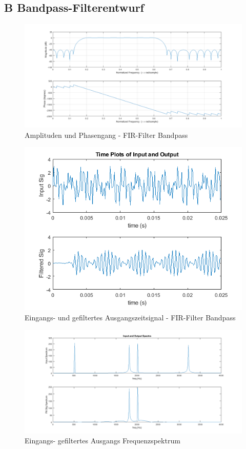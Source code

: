 \newpage
\subsection{B Bandpass-Filterentwurf}






\begin{figure}[h]
\centering
\includegraphics[width=0.7\linewidth]{./Bilder/Attachment_B_fir_3_Amplitudengang}
\caption{Amplituden und Phasengang - FIR-Filter Bandpass}
\label{fig:Attachment_B_fir_3_Amplitudengang}
\end{figure}

\begin{figure}[h]
\centering
\includegraphics[width=0.7\linewidth]{./Bilder/Attachment_B_fir_3_Timeplot}
\caption{Eingangs- und gefiltertes Ausgangszeitsignal  - FIR-Filter Bandpass}
\label{fig:Attachment_B_fir_3_Timeplot}
\end{figure}


\begin{figure}[h]
\centering
\includegraphics[width=0.7\linewidth]{./Bilder/Attachment_B_fir_3_Spektrum}
\caption{Eingangs- gefiltertes Ausgangs Frequenzspektrum}
\label{fig:Attachment_B_fir_3_Spektrum}
\end{figure}


